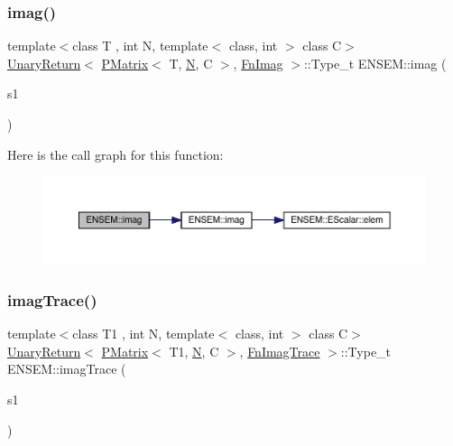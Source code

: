\subsubsection{\texorpdfstring{imag()}{imag()}}
{\footnotesize\ttfamily template$<$class T , int N, template$<$ class, int $>$ class C$>$ \\
\mbox{\hyperlink{structENSEM_1_1UnaryReturn}{Unary\+Return}}$<$ \mbox{\hyperlink{classENSEM_1_1PMatrix}{P\+Matrix}}$<$ T, \mbox{\hyperlink{operator__name__util_8cc_a7722c8ecbb62d99aee7ce68b1752f337}{N}}, C $>$, \mbox{\hyperlink{structENSEM_1_1FnImag}{Fn\+Imag}} $>$\+::Type\+\_\+t E\+N\+S\+E\+M\+::imag (\begin{DoxyParamCaption}\item[{const \mbox{\hyperlink{classENSEM_1_1PMatrix}{P\+Matrix}}$<$ T, \mbox{\hyperlink{operator__name__util_8cc_a7722c8ecbb62d99aee7ce68b1752f337}{N}}, C $>$ \&}]{s1 }\end{DoxyParamCaption})\hspace{0.3cm}{\ttfamily [inline]}}

Here is the call graph for this function\+:\nopagebreak
\begin{figure}[H]
\begin{center}
\leavevmode
\includegraphics[width=350pt]{df/d0a/group__primmatrix_ga0e708a122654c3ad8295f071a5857abb_cgraph}
\end{center}
\end{figure}
\mbox{\label{group__primmatrix_gaa17cf25ee54da2665418c0cfbccc0ae9}} 
\subsubsection{\texorpdfstring{imagTrace()}{imagTrace()}}
{\footnotesize\ttfamily template$<$class T1 , int N, template$<$ class, int $>$ class C$>$ \\
\mbox{\hyperlink{structENSEM_1_1UnaryReturn}{Unary\+Return}}$<$ \mbox{\hyperlink{classENSEM_1_1PMatrix}{P\+Matrix}}$<$ T1, \mbox{\hyperlink{operator__name__util_8cc_a7722c8ecbb62d99aee7ce68b1752f337}{N}}, C $>$, \mbox{\hyperlink{structENSEM_1_1FnImagTrace}{Fn\+Imag\+Trace}} $>$\+::Type\+\_\+t E\+N\+S\+E\+M\+::imag\+Trace (\begin{DoxyParamCaption}\item[{const \mbox{\hyperlink{classENSEM_1_1PMatrix}{P\+Matrix}}$<$ T1, \mbox{\hyperlink{operator__name__util_8cc_a7722c8ecbb62d99aee7ce68b1752f337}{N}}, C $>$ \&}]{s1 }\end{DoxyParamCaption})\hspace{0.3cm}{\ttfamily [inline]}}


